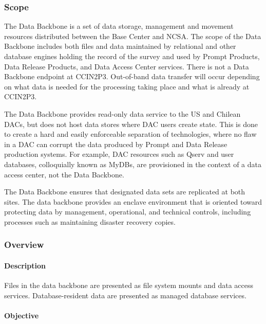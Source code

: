 \subsubsection{Scope}

The Data Backbone is a set of data storage, management and movement
resources distributed between the Base Center and NCSA. The
scope of the Data Backbone includes both files and data maintained by relational
and other database engines holding the record of the survey and used by
Prompt Products, Data Release Products, and Data Access Center services. There is not a 
Data Backbone endpoint at CCIN2P3.  Out-of-band data transfer will occur depending on what data is needed for the processing taking place and what is already at CCIN2P3.  

The Data Backbone provides read-only data service to the US and Chilean
DACs, but does not host data stores where DAC users create state. This is
done to create a hard and easily enforceable separation of technologies,
where no flaw in a DAC can corrupt the data produced by Prompt and Data Release
production systems. For example, DAC resources such as Qserv and user databases,
colloquially known as MyDBs, are provisioned in the context of a data
access center, not the Data Backbone.

The Data Backbone ensures that designated data sets are replicated at both sites.
The data backbone provides an enclave environment that is oriented toward
protecting data by management, operational, and technical controls,
including processes such as maintaining disaster recovery copies.

\subsubsection{Overview}

\paragraph{Description}

Files in the data backbone are presented as file system mounts and data access
services. Database-resident data are presented as managed database services.

\paragraph{Objective}

